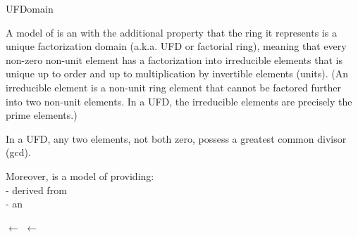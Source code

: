 \begin{ccRefConcept}{UFDomain}


\ccDefinition


A model of  is an  with the additional property 
that the ring it represents is a unique factorization domain 
(a.k.a. UFD or factorial ring), meaning that every non-zero non-unit 
element has a factorization into irreducible elements that is unique 
up to order and up to multiplication by invertible elements (units). 
(An irreducible element is a non-unit ring element that cannot be factored 
further into two non-unit elements. In a UFD, the irreducible elements 
are precisely the prime elements.)

In a UFD, any two elements, not both zero, possess a greatest common 
divisor (gcd). 

Moreover,  is a model of 
 providing:\\
 
-  derived from  \\
-  an \\
  

 
\ccRefines
 
\ccSeeAlso
        $ \leftarrow $   
        $ \leftarrow $   

\ccHasModels


\end{ccRefConcept}